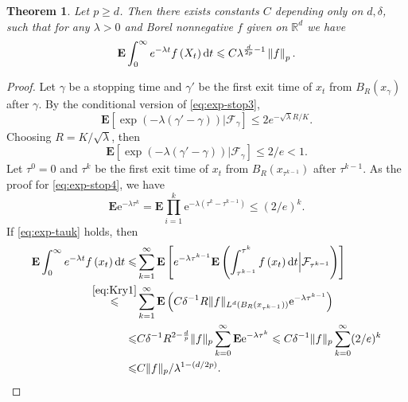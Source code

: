 \documentclass[twoside, 12pt]{book}
\numberwithin{equation}{chapter}
\newtheorem{theorem}{Theorem}[section]
\def\cF{{\mathcal F}}
\def\bE{{\mathbf E}}
\def\l{\left}
\def\r{\right}
\def\geq{\geqslant}
\def\leq{\leqslant}
\def\d{\text{\rm{d}}}
\def\e{\mathrm{e}}
\begin{document}
	\begin{theorem}\label{thm:Kry}
		Let $p \geq d$. Then there exists constants $C$ depending only on $d, \delta$, such that for any $\lambda>0$ and Borel nonnegative $f$ given on $\mathbb{R}^d$ we have
		\begin{equation}\label{eq:Kry2}
			\bE \int_0^{\infty} e^{-\lambda t} f\left(X_t\right) \d t \leq C\lambda^{\frac{d}{2p}-1}  \left\|f\right\|_{p}.  
		\end{equation}
	\end{theorem}
	\begin{proof}
		Let $\gamma$ be a stopping time and $\gamma'$ be the first exit time of $x_t$ from $B_{R}(x_{\gamma})$ after $\gamma$.  By the conditional version of \eqref{eq:exp-stop3}, 
		\[
		\bE \l[ \exp \left(-\lambda (\gamma'-\gamma)\right)\Big| \cF_{\gamma} \r] \leq 2 e^{-\sqrt{\lambda} R/K}. 
		\]
		Choosing $R=K/\sqrt{\lambda}$, then 
		\[
		\bE \l[ \exp \left(-\lambda (\gamma'-\gamma)\right)\Big| \cF_{\gamma} \r] \leq 2/e<1. 
		\]
		Let $\tau^0=0$ and $\tau^k$ be the first exit time of $x_t$ from $B_{R}(x_{\tau^{k-1}})$ after $\tau^{k-1}$. As the proof for \eqref{eq:exp-stop4}, we have 
		\begin{equation}\label{eq:exp-tauk}
			\bE \e^{-\lambda \tau^k} = \bE \prod_{i=1}^k \e^{-\lambda (\tau^k-\tau^{k-1})} \leq (2/e)^k. 
		\end{equation}
		If \eqref{eq:exp-tauk} holds, then 
		\begin{align*}
			\bE \int_0^{\infty} e^{-\lambda t} f\left(x_t\right) \d t\leq& \sum_{k=1}^{\infty} \bE \l [e^{-\lambda \tau^{k-1}} \bE \l( \int_{\tau^{k-1}}^{\tau^{k}}  f\left(x_t\right) \d t \Big| \cF_{\tau^{k-1}} \r) \r]\\
			\overset{\eqref{eq:Kry1}}{\leq} &\sum_{k=1}^{\infty} \bE  \l(  C\delta^{-1}R\|f\|_{L^d(B_{R}(x_{\tau^{k-1}}))} \e^{-\lambda \tau^{k-1}} \r)\\
			\leq & C \delta^{-1} R^{2-\frac{d}{p}}\|f\|_{p} \sum_{k=0}^\infty  \bE \e^{-\lambda \tau^k}  \leq  C \delta^{-1} \|f\|_{p} \sum_{k=0}^\infty (2/e)^k\\
			\leq & C \|f\|_p/ \lambda^{1-(d/2p)}. 
		\end{align*}
	\end{proof}
	
\end{document}
